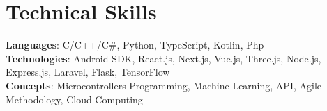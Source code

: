 \section{Technical Skills}
    \begin{itemize}[leftmargin=0.15in, label={}]
	\small{\item{
		\textbf{Languages}{: C/C++/C\#, Python, TypeScript, Kotlin, Php} \\
		\textbf{Technologies}{: Android SDK, React.js, Next.js, Vue.js, Three.js, Node.js, Express.js, Laravel, Flask, TensorFlow} \\
		\textbf{Concepts}{: Microcontrollers Programming, Machine Learning, API, Agile Methodology, Cloud Computing}
	}}
    \end{itemize}